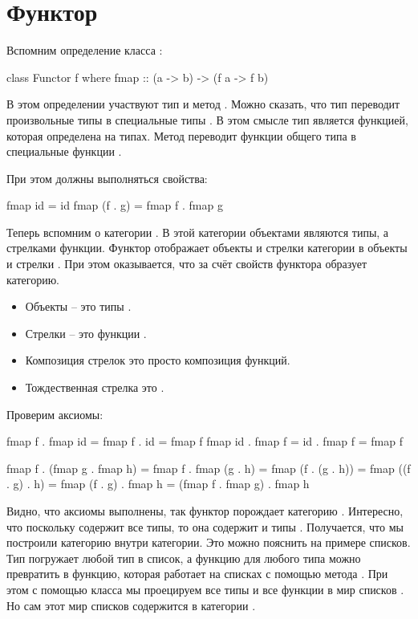 \section{Функтор}

Вспомним определение класса :

\begin{code}
class Functor f where
    fmap :: (a -> b) -> (f a -> f b)
\end{code}

В этом определении участвуют тип  и метод .
Можно сказать, что тип  переводит произвольные типы  в 
специальные типы . В этом смысле тип  является функцией, которая
определена на типах. Метод  переводит функции общего
типа  в специальные функции . 

При этом должны выполняться свойства:

\begin{code}
fmap id  = id
fmap (f . g) = fmap f . fmap g
\end{code}

Теперь вспомним о категории . В этой категории объектами являются
типы, а стрелками функции. Функтор   отображает объекты и 
стрелки категории  в объекты и стрелки .
При этом оказывается, что за счёт свойств функтора 
образует категорию. 

\begin{itemize}
\item Объекты -- это типы .
\item Стрелки -- это функции .
\item Композиция стрелок это просто композиция функций.
\item Тождественная стрелка это .
\end{itemize}

Проверим аксиомы:

\begin{code}
fmap f . fmap id = fmap f . id = fmap f
fmap id . fmap f = id . fmap f = fmap f

    fmap f . (fmap g . fmap h) 
=   fmap f . fmap (g . h) 
=   fmap (f . (g . h))
=   fmap ((f . g) . h)
=   fmap (f . g) . fmap h
=   (fmap f . fmap g) . fmap h
\end{code}

Видно, что аксиомы выполнены, так функтор  порождает
категорию . Интересно, что поскольку 
содержит все типы, то она содержит и типы \mbox{}. 
Получается, что мы построили категорию внутри категории. 
Это можно пояснить на примере списков. Тип \In{[]}
погружает любой тип в список, а функцию для любого типа
можно превратить в функцию, которая работает на списках с 
помощью метода . При этом с помощью класса 
мы проецируем все типы и все функции в мир списков \In{[a]}.
Но сам этот мир списков содержится в категории .

